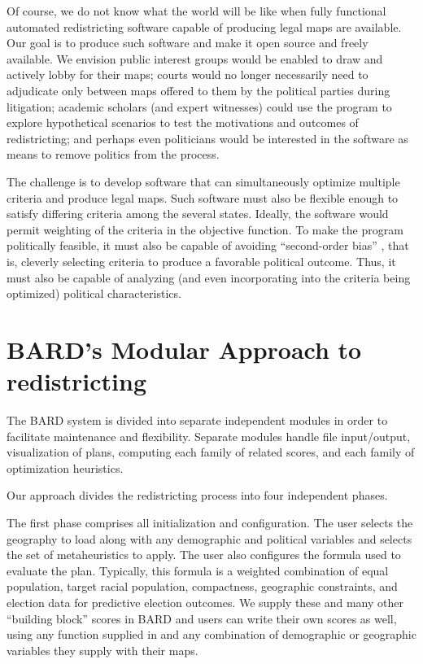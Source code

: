 \documentclass[article]{JSSstyle/jss}
\begin{document}
Of course, we do not know what the world will be like when fully functional 
automated redistricting software capable of producing legal maps are available.  
Our goal is to produce such software and make it open source and freely available.  
We envision public interest groups would be enabled to draw and actively lobby for their maps; 
courts would no longer necessarily need to adjudicate only between 
maps offered to them by the political parties during litigation; 
academic scholars (and expert witnesses) could use the program to 
explore hypothetical scenarios to test the motivations and outcomes 
of redistricting; and perhaps even politicians would 
be interested in the software as means to remove politics from the 
process.  

The challenge is to develop software that can simultaneously optimize multiple 
criteria and produce legal maps.  Such software must also be flexible 
enough to satisfy differing criteria among the several states.  
Ideally, the software would permit weighting of the criteria in the 
objective function.  To make the program politically feasible, it 
must also be capable of avoiding ``second-order bias'' 
\citep[][]{Parker90}, that is, cleverly selecting criteria to produce 
a favorable political outcome.  Thus, it must also be capable of 
analyzing (and even incorporating into the criteria being optimized) political 
characteristics.

\section {BARD's Modular Approach to redistricting}

The BARD system is divided into separate independent modules in order to facilitate
maintenance and flexibility. Separate modules handle  file input/output, visualization
of plans, computing each family of related scores, and each family of optimization heuristics.

Our approach divides the redistricting process into four independent phases.

The first phase comprises all initialization and configuration.  The user selects the 
geography to load along with any demographic and political variables and selects 
the set of metaheuristics to apply. The user also configures the formula used to 
evaluate the plan. Typically, this formula is a weighted combination 
of equal population, target racial population, compactness, geographic constraints, 
and election data for predictive election outcomes. We
supply these and many other ``building block'' scores in BARD and users can write 
their own scores as well, using any function supplied in  and any combination
of demographic or geographic variables they supply with their maps. 
\end{document}
